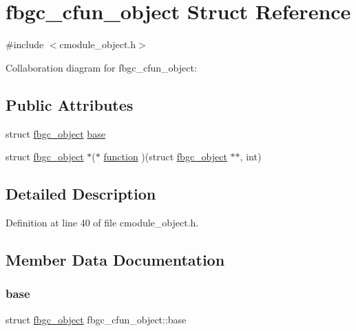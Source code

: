 \hypertarget{structfbgc__cfun__object}{}\section{fbgc\+\_\+cfun\+\_\+object Struct Reference}
\label{structfbgc__cfun__object}


{\ttfamily \#include $<$cmodule\+\_\+object.\+h$>$}



Collaboration diagram for fbgc\+\_\+cfun\+\_\+object\+:
\subsection*{Public Attributes}
\begin{DoxyCompactItemize}
\item 
struct \hyperlink{structfbgc__object}{fbgc\+\_\+object} \hyperlink{structfbgc__cfun__object_abf2c8fc0f6b5aa3c84b102770d2ff62d}{base}
\item 
struct \hyperlink{structfbgc__object}{fbgc\+\_\+object} $\ast$($\ast$ \hyperlink{structfbgc__cfun__object_acc134ef71c8d93a607ed3b22f03b4f20}{function} )(struct \hyperlink{structfbgc__object}{fbgc\+\_\+object} $\ast$$\ast$, int)
\end{DoxyCompactItemize}


\subsection{Detailed Description}


Definition at line 40 of file cmodule\+\_\+object.\+h.



\subsection{Member Data Documentation}
\mbox{\label{structfbgc__cfun__object_abf2c8fc0f6b5aa3c84b102770d2ff62d}} 
\subsubsection{\texorpdfstring{base}{base}}
{\footnotesize\ttfamily struct \hyperlink{structfbgc__object}{fbgc\+\_\+object} fbgc\+\_\+cfun\+\_\+object\+::base}



